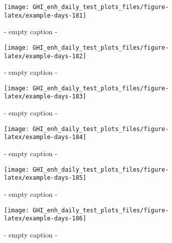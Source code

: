 \documentclass[
  10pt,
  a4paper,oneside]{article}
\begin{document}
\begin{figure}[H]

{\centering \texttt{[image: GHI\_enh\_daily\_test\_plots\_files/figure-latex/example-days-181]} 

}

\caption{ - empty caption - }\label{fig:example-days-181}
\end{figure}

\begin{figure}[H]

{\centering \texttt{[image: GHI\_enh\_daily\_test\_plots\_files/figure-latex/example-days-182]} 

}

\caption{ - empty caption - }\label{fig:example-days-182}
\end{figure}

\begin{figure}[H]

{\centering \texttt{[image: GHI\_enh\_daily\_test\_plots\_files/figure-latex/example-days-183]} 

}

\caption{ - empty caption - }\label{fig:example-days-183}
\end{figure}

\begin{figure}[H]

{\centering \texttt{[image: GHI\_enh\_daily\_test\_plots\_files/figure-latex/example-days-184]} 

}

\caption{ - empty caption - }\label{fig:example-days-184}
\end{figure}

\begin{figure}[H]

{\centering \texttt{[image: GHI\_enh\_daily\_test\_plots\_files/figure-latex/example-days-185]} 

}

\caption{ - empty caption - }\label{fig:example-days-185}
\end{figure}

\begin{figure}[H]

{\centering \texttt{[image: GHI\_enh\_daily\_test\_plots\_files/figure-latex/example-days-186]} 

}

\caption{ - empty caption - }\label{fig:example-days-186}
\end{figure}
\end{document}

